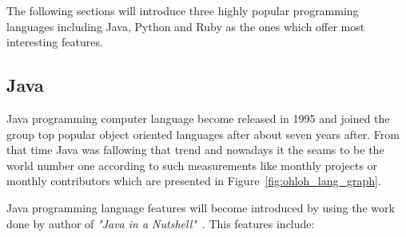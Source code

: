 The following sections will introduce three highly popular programming languages including Java, Python and Ruby as the ones which offer most interesting features. 
\subsection{Java}\label{subsec:java}
Java programming computer language become released in 1995 and joined the group top popular object oriented languages after about seven years after. From that time Java was fallowing that trend and nowadays it the seams to be the world number one according to such measurements like monthly projects or monthly contributors which are presented in Figure~\ref{fig:ohloh_lang_graph}.

Java programming language features will become introduced by using the work done by author of \textit{"Java in a Nutshell"}~\cite[pages 4-6]{java_nutshell}. This features include:
